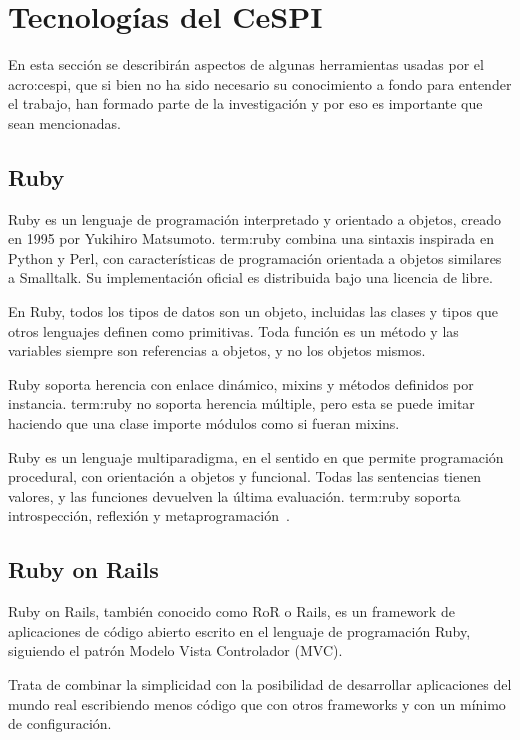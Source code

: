 \section{Tecnologías del CeSPI}
\label{anexo:A}

En esta sección se describirán aspectos de algunas herramientas usadas por el
\gls{acro:cespi}, que si bien no ha sido necesario su conocimiento a fondo para
entender el trabajo, han formado parte de la investigación y por eso es
importante que sean mencionadas.

\subsection{Ruby}

Ruby es un lenguaje de programación interpretado y orientado a objetos, creado
en 1995 por Yukihiro Matsumoto. \gls{term:ruby} combina una sintaxis inspirada
en Python y Perl, con características de programación orientada a objetos
similares a Smalltalk. Su implementación oficial es distribuida bajo una
licencia de  libre.

En Ruby, todos los tipos de datos son un objeto, incluidas las clases y tipos
que otros lenguajes definen como primitivas. Toda función es un método y las
variables siempre son referencias a objetos, y no los objetos mismos.

Ruby soporta herencia con enlace dinámico, mixins y métodos definidos por
instancia. \gls{term:ruby} no soporta herencia múltiple, pero esta se puede
imitar haciendo que una clase importe módulos como si fueran mixins.

Ruby es un lenguaje multiparadigma, en el sentido en que permite programación
procedural, con orientación a objetos y funcional. Todas las sentencias tienen
valores, y las funciones devuelven la última evaluación. \gls{term:ruby} soporta
introspección, reflexión y metaprogramación~\cite{ruby}.

\subsection{Ruby on Rails}

Ruby on Rails, también conocido como RoR o Rails, es un framework de
aplicaciones  de código abierto escrito en el lenguaje de programación
Ruby, siguiendo el patrón Modelo Vista Controlador (MVC).

Trata de combinar la simplicidad con la posibilidad de desarrollar aplicaciones
del mundo real escribiendo menos código que con otros frameworks y con un
mínimo de configuración.

